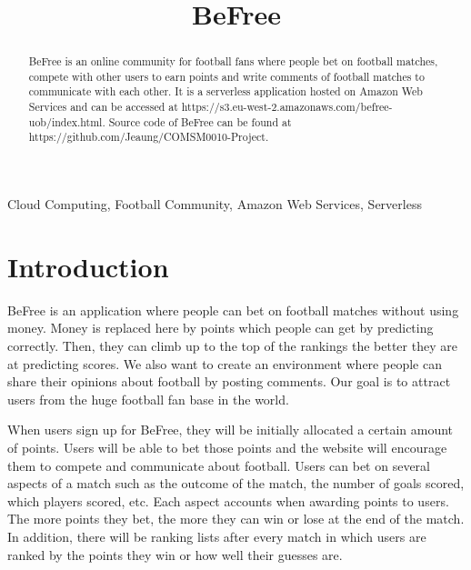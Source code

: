 \documentclass[conference]{IEEEtran}
\begin{document}
\title{BeFree\\}

\author{
\and
{}
}

\maketitle

\begin{abstract}
BeFree is an online community for football fans where
people bet on football matches, compete with other users
to earn points and write comments of football matches to communicate with each other. It is a serverless application hosted on Amazon Web Services and can be accessed at https://s3.eu-west-2.amazonaws.com/befree-uob/index.html. Source code of BeFree can be found at https://github.com/Jeaung/COMSM0010-Project.
\end{abstract}

\begin{IEEEkeywords}
Cloud Computing, Football Community, Amazon Web Services, Serverless
\end{IEEEkeywords}

\section{Introduction}
BeFree is an application where people can bet on football
matches without using money. Money is replaced here by
points which people can get by predicting correctly. Then,
they can climb up to the top of the rankings the better they
are at predicting scores. We also want to create an environment
where people can share their opinions about football by
posting comments. Our goal is to attract users from the huge football
fan base in the world.

When users sign up for BeFree, they will be initially
allocated a certain amount of points. Users will be able to bet
those points and the website will encourage them to compete
and communicate about football. Users can bet on several
aspects of a match such as the outcome of the match, the
number of goals scored, which players scored, etc. Each aspect
accounts when awarding points to users. The more points they
bet, the more they can win or lose at the end of the match.
In addition, there will be ranking lists after every match in
which users are ranked by the points they win or how well
their guesses are.
\end{document}
